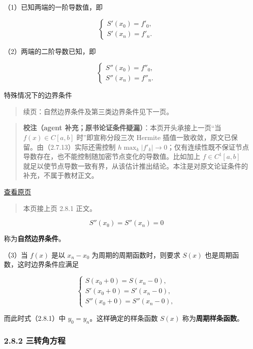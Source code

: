 \documentclass[
  10pt,
  fontset=fandol]{ctexart}
\begin{document}
（1）已知两端的一阶导数值，即

\[\begin{cases}S'(x_0)=f'_0,\\S'(x_n)=f'_n.\end{cases}\tag{2.8.3}\]

（2）两端的二阶导数已知，即

\[\begin{cases}S''(x_0)=f''_0,\\S''(x_n)=f''_n.\end{cases}\tag{2.8.4}\]

特殊情况下的边界条件

\begin{quote}
续页：自然边界条件及第三类边界条件见下一页。
\end{quote}

\begin{quote}
\textbf{校注（agent 补充；原书论证条件疑漏）}：本页开头承接上一页``当 \(f(x)\in C[a,b]\) 时''即宣称分段三次 Hermite 插值一致收敛，原文已保留。由（2.7.13）实际还需控制 \(h\max_k|f'_k|\to0\)；仅有连续性既不保证节点导数存在，也不能控制随加密节点变化的导数值。比如加上 \(f\in C^1[a,b]\) 就足以使节点导数一致有界，从该估计推出结论。本注是对原文论证条件的补充，不属于教材正文。
\end{quote}

\href{../../source-images/pdf-050.jpeg}{查看原页}

\begin{quote}
本页接上页 2.8.1 正文。
\end{quote}

\[S''(x_0)=S''(x_n)=0\tag{2.8.4'}\]

称为\textbf{自然边界条件}。

（3）当 \(f(x)\) 是以 \(x_n-x_0\) 为周期的周期函数时，则要求 \(S(x)\) 也是周期函数，这时边界条件应满足

\[\begin{cases}
S(x_0+0)=S(x_n-0),\\
S'(x_0+0)=S'(x_n-0),\\
S''(x_0+0)=S''(x_n-0),
\end{cases}\tag{2.8.5}\]

而此时式（2.8.1）中 \(y_0=y_n\)。这样确定的样条函数 \(S(x)\) 称为\textbf{周期样条函数}。

\subsubsection{2.8.2 三转角方程}\label{ux4e09ux8f6cux89d2ux65b9ux7a0b}
\end{document}
